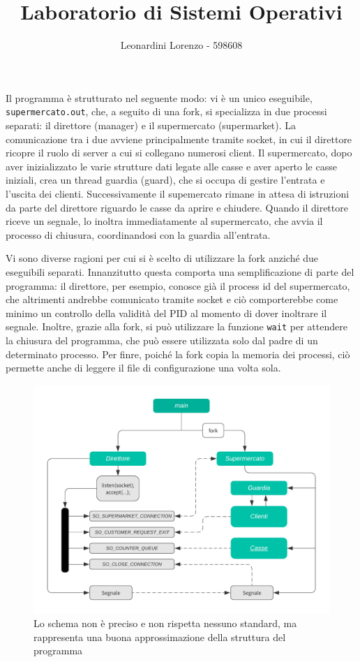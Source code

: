 \documentclass[a4paper,11pt,twoside] {article}
\title{\textbf{Laboratorio di Sistemi Operativi}}
\author{Leonardini Lorenzo - 598608}
\date{}
\begin{document}
\maketitle

Il programma è strutturato nel seguente modo: vi è un unico eseguibile, \lstinline{supermercato.out}, che, a seguito di una fork, si specializza in due processi separati: il direttore (manager) e il supermercato (supermarket). La comunicazione tra i due avviene principalmente tramite socket, in cui il direttore ricopre il ruolo di server a cui si collegano numerosi client. Il supermercato, dopo aver inizializzato le varie strutture dati legate alle casse e aver aperto le casse iniziali, crea un thread guardia (guard), che si occupa di gestire l'entrata e l'uscita dei clienti. Successivamente il supemercato rimane in attesa di istruzioni da parte del direttore riguardo le casse da aprire e chiudere. Quando il direttore riceve un segnale, lo inoltra immediatamente al supermercato, che avvia il processo di chiusura, coordinandosi con la guardia all'entrata.

Vi sono diverse ragioni per cui si è scelto di utilizzare la fork anziché due eseguibili separati. Innanzitutto questa comporta una semplificazione di parte del programma: il direttore, per esempio, conosce già il process id del supermercato, che altrimenti andrebbe comunicato tramite socket e ciò comporterebbe come minimo un controllo della validità del PID al momento di dover inoltrare il segnale. Inoltre, grazie alla fork, si può utilizzare la funzione \lstinline{wait} per attendere la chiusura del programma, che può essere utilizzata solo dal padre di un determinato processo. Per finre, poiché la fork copia la memoria dei processi, ciò permette anche di leggere il file di configurazione una volta sola.

\begin{figure}[!h]
	\begin{center}
		\includegraphics[width=.8\textwidth]{chart}
		\caption{\small Lo schema non è preciso e non rispetta nessuno standard, ma rappresenta una buona approssimazione della struttura del programma}
	\end{center}
\end{figure}
\end{document}
